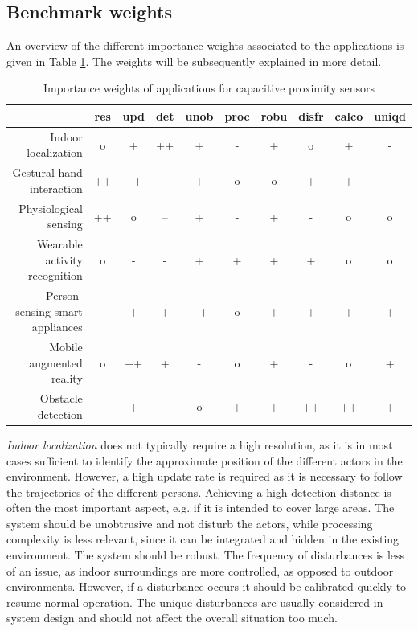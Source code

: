 \subsection{Benchmark weights}
An overview of the different importance weights associated to the applications is given in Table \ref{tab:bench_cap_apps}. The weights will be subsequently explained in more detail.

\begin{table}[htbp]
  \centering
  \caption{Importance weights of applications for capacitive proximity sensors}
       \begin{tabular}{rccccccccc}
    \toprule
          & res   & upd   & det   & unob  & proc  & robu  & disfr & calco & uniqd \\
    \midrule
        Indoor localization & o     & +     & ++    & +     & -     & +     & o     & +     & - \\
    Gestural hand interaction & ++    & ++    & -     & +     & o     & o     & +     & +     & - \\
    Physiological sensing & ++    & o     & --    & +     & -     & +     & -     & o     & o \\
    Wearable activity recognition & o     & -     & -     & +     & +     & +     & +     & o     & o \\
    Person-sensing smart appliances & -     & +     & +     & ++    & o     & +     & +     & +     & + \\
    Mobile augmented reality & o     & ++    & +     & -     & o     & +     & -     & o     & + \\
    Obstacle detection & -     & +     & -     & o     & +     & +     & ++    & ++    & + \\

    \bottomrule
    \end{tabular}%
  \label{tab:bench_cap_apps}%
\end{table}%

\emph{Indoor localization} does not typically require a high resolution, as it is in most cases sufficient to identify the approximate position of the different actors in the environment. However, a high update rate is required as it is necessary to follow the trajectories of the different persons. Achieving a high detection distance is often the most important aspect, e.g. if it is intended to cover large areas. The system should be unobtrusive and not disturb the actors, while processing complexity is less relevant, since it can be integrated and hidden in the existing environment. The system should be robust. The frequency of disturbances is less of an issue, as indoor surroundings are more controlled, as opposed to outdoor environments. However, if a disturbance occurs it should be calibrated quickly to resume normal operation. The unique disturbances are usually considered in system design and should not affect the overall situation too much.

